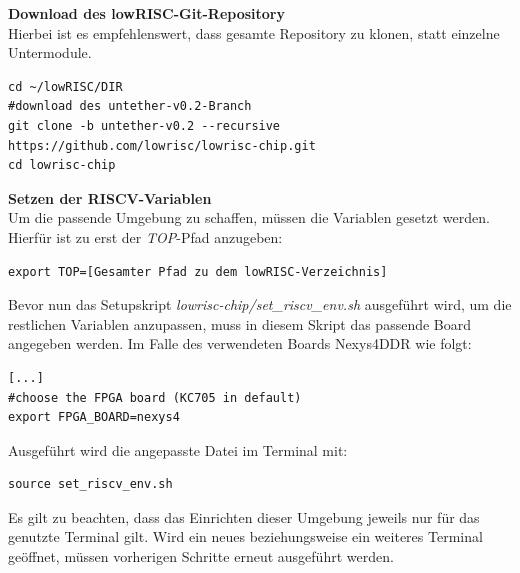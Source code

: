 \textbf{Download des lowRISC-Git-Repository}\\

Hierbei ist es empfehlenswert, dass gesamte Repository zu klonen, statt einzelne Untermodule.\\

\begin{lstlisting}[caption={Download des Repositories},label={code:riscrepository}]
cd ~/lowRISC/DIR
#download des untether-v0.2-Branch
git clone -b untether-v0.2 --recursive https://github.com/lowrisc/lowrisc-chip.git
cd lowrisc-chip
\end{lstlisting}


\vspace{5mm}
\textbf{Setzen der RISCV-Variablen}\\

Um die passende Umgebung zu schaffen, müssen die Variablen gesetzt werden. Hierfür ist zu erst der \emph{TOP}-Pfad anzugeben:\\

\begin{lstlisting}[caption={Setzen der TOP-Variable},label={code:topvariable}]
export TOP=[Gesamter Pfad zu dem lowRISC-Verzeichnis]
\end{lstlisting}



Bevor nun das Setupskript \emph{lowrisc-chip/set\_riscv\_env.sh} ausgeführt wird, um die restlichen Variablen anzupassen, muss in diesem Skript das passende Board angegeben werden.
Im Falle des verwendeten Boards Nexys4DDR wie folgt:\\

\begin{lstlisting}[caption={Anpassung des Zielsystems},label={code:zielsystem}]
[...]
#choose the FPGA board (KC705 in default)
export FPGA_BOARD=nexys4
\end{lstlisting}


Ausgeführt wird die angepasste Datei im Terminal mit:\\

\begin{lstlisting}[caption={Umgebungsvariablen},label={code:umgebungsvariablen}]
source set_riscv_env.sh
\end{lstlisting}

Es gilt zu beachten, dass das Einrichten dieser Umgebung jeweils nur für das genutzte Terminal gilt. Wird ein neues beziehungsweise ein weiteres Terminal geöffnet, müssen vorherigen Schritte erneut ausgeführt werden.\\

